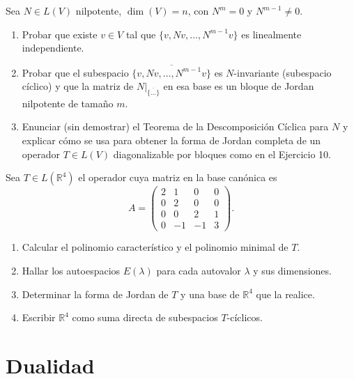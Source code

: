 \documentclass{article}
\newcommand{\R}{\mathbb{R}}
\DeclareMathOperator{\dimm}{dim}
\newcommand{\gen}[1]{\overline{\{#1\}}}          %
\newcommand{\restr}[2]{{#1}\big|_{#2}}            %
\theoremstyle{plain}
\theoremstyle{definition}
\theoremstyle{remark}
\newenvironment{ejercicio}[1]{\begin{trivlist}
\item[\hskip \labelsep {\bfseries Ejercicio}\hskip \labelsep {\bfseries #1.}]}{\end{trivlist}}
\begin{document}
\begin{ejercicio}{11}
    Sea \(N \in L(V)\) nilpotente, \(\dimm(V) = n\), con \(N^{m} = 0\) y \(N^{m-1} \neq 0\).
    \begin{enumerate}
        \item Probar que existe \(v \in V\) tal que \(\{v, Nv, \ldots, N^{m-1}v\}\) es linealmente independiente.
        \item Probar que el subespacio \(\gen{v,Nv,\ldots,N^{m-1}v}\) es \(N\)-invariante (subespacio cíclico) y que la matriz de \(\restr{N}{\gen{\ldots}}\) en esa base es un bloque de Jordan nilpotente de tamaño \(m\).
        \item Enunciar (sin demostrar) el Teorema de la Descomposición Cíclica para \(N\) y explicar cómo se usa para obtener la forma de Jordan completa de un operador \(T \in L(V)\) diagonalizable por bloques como en el Ejercicio 10.
    \end{enumerate}
\end{ejercicio}

\begin{ejercicio}{12}
    Sea \(T \in L(\R^4)\) el operador cuya matriz en la base canónica es
    \[
        A = \begin{pmatrix} 2 & 1 & 0 & 0 \\ 0 & 2 & 0 & 0 \\ 0 & 0 & 2 & 1 \\ 0 & -1 & -1 & 3\end{pmatrix}.
    \]
    \begin{enumerate}
        \item Calcular el polinomio característico y el polinomio minimal de \(T\).
        \item Hallar los autoespacios \(E(\lambda)\) para cada autovalor \(\lambda\) y sus dimensiones.
        \item Determinar la forma de Jordan de \(T\) y una base de \(\R^4\) que la realice.
        \item Escribir \(\R^4\) como suma directa de subespacios \(T\)-cíclicos.
    \end{enumerate}
\end{ejercicio}

\section{Dualidad}
\end{document}
